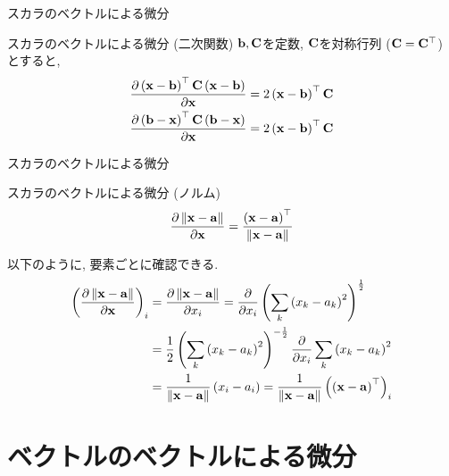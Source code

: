 \documentclass[dvipdfmx,notheorems,t]{beamer}
\begin{document}
\begin{frame}{スカラのベクトルによる微分}
\begin{block}{スカラのベクトルによる微分 (二次関数)}
  $\vb{b}, \vb{C}$を定数, $\vb{C}$を対称行列 ($\vb{C} = \vb{C}^\top$) とすると,
  \begin{align*}
    \pdv{\left( \vb{x} - \vb{b} \right)^\top \vb{C} \left( \vb{x} - \vb{b} \right)}{\vb{x}}
      &= 2 \left( \vb{x} - \vb{b} \right)^\top \vb{C} \\
    \pdv{\left( \vb{b} - \vb{x} \right)^\top \vb{C} \left( \vb{b} - \vb{x} \right)}{\vb{x}}
      &= 2 \left( \vb{x} - \vb{b} \right)^\top \vb{C}
  \end{align*}
\end{block}
\end{frame}

\begin{frame}{スカラのベクトルによる微分}
\begin{block}{スカラのベクトルによる微分 (ノルム)}
  \begin{align*}
    \pdv{\left\| \vb{x} - \vb{a} \right\|}{\vb{x}}
      = \frac{\left( \vb{x} - \vb{a} \right)^\top}{\left\| \vb{x} - \vb{a} \right\|}
  \end{align*}
\end{block}

以下のように, 要素ごとに確認できる.
\begin{align*}
  \left( \pdv{\left\| \vb{x} - \vb{a} \right\|}{\vb{x}} \right)_i
    &= \pdv{\left\| \vb{x} - \vb{a} \right\|}{x_i}
    = \pdv{x_i} \left( \sum_k \left( x_k - a_k \right)^2 \right)^\frac{1}{2} \\
    &= \frac{1}{2} \left( \sum_k \left( x_k - a_k \right)^2 \right)^{-\frac{1}{2}}
      \pdv{x_i} \sum_k \left( x_k - a_k \right)^2 \\
    &= \frac{1}{\left\| \vb{x} - \vb{a} \right\|} \left( x_i - a_i \right)
    = \frac{1}{\left\| \vb{x} - \vb{a} \right\|}
      \left( \left( \vb{x} - \vb{a} \right)^\top \right)_i
\end{align*}
\end{frame}

\section{ベクトルのベクトルによる微分}
\end{document}
